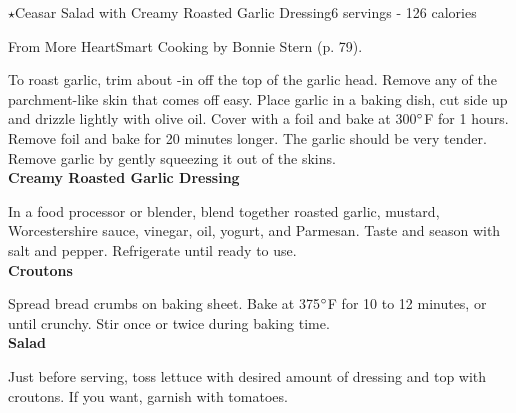 \begin{recipe}{$\star$Ceasar Salad with Creamy Roasted Garlic Dressing}{6 servings - 126 calories}{}

\freeform From {\normalfont More HeartSmart Cooking} by Bonnie Stern (p. 79).


To roast garlic, trim about -in off the top of the garlic head. Remove any of the parchment-like skin that comes off easy. Place garlic in a baking dish, cut side up and drizzle lightly with olive oil. Cover with a foil and bake at 300$\degree$F for 1 hours. Remove foil and bake for 20 minutes longer. The garlic should be very tender. Remove garlic by gently squeezing it out of the skins.\\

\textbf{Creamy Roasted Garlic Dressing}

In a food processor or blender, blend together roasted garlic, mustard, Worcestershire sauce, vinegar, oil, yogurt, and Parmesan. Taste and season with salt and pepper. Refrigerate until ready to use.\\

\textbf{Croutons}

Spread bread crumbs on baking sheet. Bake at 375$\degree$F for 10 to 12 minutes, or until crunchy. Stir once or twice during baking time.\\

\textbf{Salad}

Just before serving, toss lettuce with desired amount of dressing and top with croutons. If you want, garnish with tomatoes.

\end{recipe}